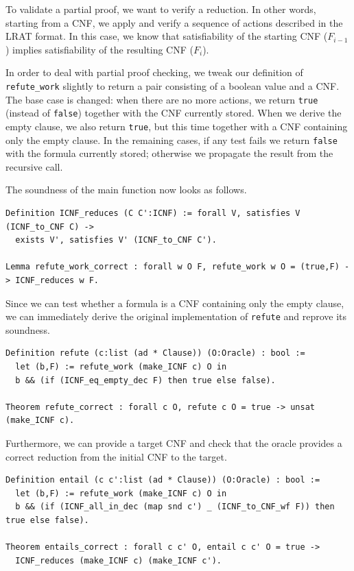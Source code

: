 \documentclass{article}
\begin{document}
To validate a partial proof, we want to verify a reduction. %
In other words, starting from a CNF, we apply and verify a sequence of actions described in the LRAT format. %
In this case, we know that satisfiability of the starting CNF ($F_{i-1}$) implies satisfiability of the resulting CNF ($F_i$).
%

In order to deal with partial proof checking, we tweak our definition of \lstinline+refute_work+ slightly to return a
pair consisting of a boolean value and a CNF.
The base case is changed: when there are no more actions, we return \lstinline+true+ (instead of \lstinline+false+)
together with the CNF currently stored.
When we derive the empty clause, we also return \lstinline+true+, but this time together with a CNF containing only the
empty clause.
In the remaining cases, if any test fails we return \lstinline+false+ with the formula currently stored; otherwise we
propagate the result from the recursive call.

The soundness of the main function now looks as follows.

\begin{lstlisting}
Definition ICNF_reduces (C C':ICNF) := forall V, satisfies V (ICNF_to_CNF C) ->
  exists V', satisfies V' (ICNF_to_CNF C').

Lemma refute_work_correct : forall w O F, refute_work w O = (true,F) -> ICNF_reduces w F.
\end{lstlisting}

Since we can test whether a formula is a CNF containing only the empty clause, we can immediately derive the original
implementation of \lstinline+refute+ and reprove its soundness.

\begin{lstlisting}
Definition refute (c:list (ad * Clause)) (O:Oracle) : bool :=
  let (b,F) := refute_work (make_ICNF c) O in
  b && (if (ICNF_eq_empty_dec F) then true else false).

Theorem refute_correct : forall c O, refute c O = true -> unsat (make_ICNF c).
\end{lstlisting}

Furthermore, we can provide a target CNF and check that the oracle provides a correct reduction from the initial CNF to
the target.

\begin{lstlisting}
Definition entail (c c':list (ad * Clause)) (O:Oracle) : bool :=
  let (b,F) := refute_work (make_ICNF c) O in
  b && (if (ICNF_all_in_dec (map snd c') _ (ICNF_to_CNF_wf F)) then true else false).

Theorem entails_correct : forall c c' O, entail c c' O = true ->
  ICNF_reduces (make_ICNF c) (make_ICNF c').
\end{lstlisting}
\end{document}
